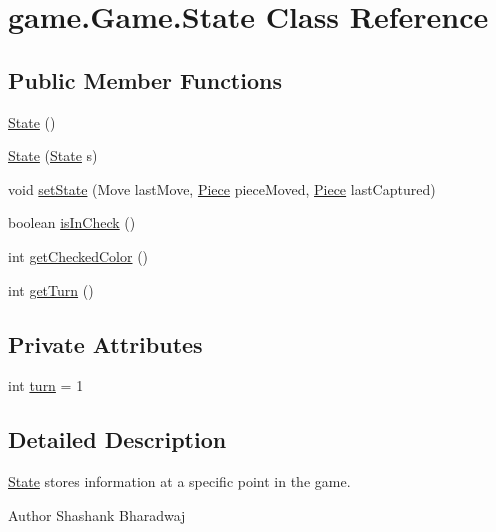\hypertarget{classgame_1_1_game_1_1_state}{\section{game.\-Game.\-State Class Reference}
\label{classgame_1_1_game_1_1_state}
}
\subsection*{Public Member Functions}
\begin{DoxyCompactItemize}
\item 
\hyperlink{classgame_1_1_game_1_1_state_acd7e7c52d8be9391c072ad7f17d8bfbd}{State} ()
\item 
\hyperlink{classgame_1_1_game_1_1_state_a543a3e52fe95dbb4615d402046516814}{State} (\hyperlink{classgame_1_1_game_1_1_state}{State} s)
\item 
void \hyperlink{classgame_1_1_game_1_1_state_acff6fcbfc126e2cddddf2039c23d50f7}{set\-State} (Move last\-Move, \hyperlink{classpieces_1_1_piece}{Piece} piece\-Moved, \hyperlink{classpieces_1_1_piece}{Piece} last\-Captured)
\item 
boolean \hyperlink{classgame_1_1_game_1_1_state_abfc8d34239b12d839f80abe4eb68a23c}{is\-In\-Check} ()
\item 
int \hyperlink{classgame_1_1_game_1_1_state_a1a4697dba2d94faee2cfacf138d3b9c1}{get\-Checked\-Color} ()
\item 
int \hyperlink{classgame_1_1_game_1_1_state_a1bc13e0e8116b07f9bba89881ac78084}{get\-Turn} ()
\end{DoxyCompactItemize}
\subsection*{Private Attributes}
\begin{DoxyCompactItemize}
\item 
int \hyperlink{classgame_1_1_game_1_1_state_a3cc50de4b7853ee4dfcd559a29ffffd3}{turn} = 1
\end{DoxyCompactItemize}


\subsection{Detailed Description}
\hyperlink{classgame_1_1_game_1_1_state}{State} stores information at a specific point in the game. \begin{DoxyAuthor}{Author}
Shashank Bharadwaj 
\end{DoxyAuthor}


